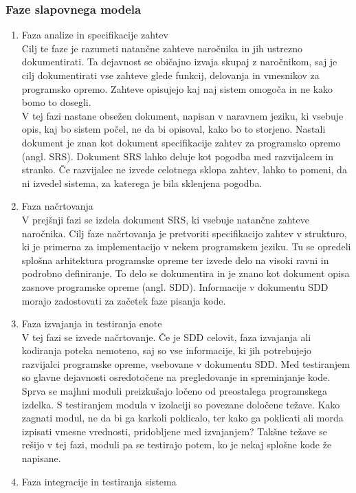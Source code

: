\documentclass[a4paper,12pt,openright]{book}
\begin{document}
\subsubsection{Faze slapovnega modela}
\begin{enumerate}
    \item Faza analize in specifikacije zahtev \\
    Cilj te faze je razumeti natančne zahteve naročnika in jih ustrezno dokumentirati. Ta dejavnost se običajno izvaja skupaj z naročnikom, saj je cilj dokumentirati vse zahteve glede funkcij, delovanja in vmesnikov za programsko opremo. Zahteve opisujejo kaj naj sistem omogoča in ne kako bomo to dosegli. \\
    V tej fazi nastane obsežen dokument, napisan v naravnem jeziku, ki vsebuje opis, kaj bo sistem počel, ne da bi opisoval, kako bo to storjeno. Nastali dokument je znan kot dokument specifikacije zahtev za programsko opremo (angl. SRS). Dokument SRS lahko deluje kot pogodba med razvijalcem in stranko. Če razvijalec ne izvede celotnega sklopa zahtev, lahko to pomeni, da ni izvedel sistema, za katerega je bila sklenjena pogodba.
    \item Faza načrtovanja \\
     V prejšnji fazi se izdela dokument SRS, ki vsebuje natančne zahteve naročnika. Cilj faze načrtovanja je pretvoriti specifikacijo zahtev v strukturo, ki je primerna za implementacijo v nekem programskem jeziku. Tu se opredeli splošna arhitektura programske opreme ter izvede delo na visoki ravni in podrobno deﬁniranje. To delo se dokumentira in je znano kot dokument opisa zasnove programske opreme (angl. SDD). Informacije v dokumentu SDD morajo zadostovati za začetek faze pisanja kode.
    \item Faza izvajanja in testiranja enote \\
    V tej fazi se izvede načrtovanje. Če je SDD celovit, faza izvajanja ali kodiranja poteka nemoteno, saj so vse informacije, ki jih potrebujejo razvijalci programske opreme, vsebovane v dokumentu SDD.
Med testiranjem so glavne dejavnosti osredotočene na pregledovanje in spreminjanje kode. Sprva se majhni moduli preizkušajo ločeno od preostalega programskega izdelka. S testiranjem modula v izolaciji so povezane določene težave. Kako zagnati modul, ne da bi ga karkoli poklicalo, ter kako ga poklicati ali morda izpisati vmesne vrednosti, pridobljene med izvajanjem? Takšne težave se rešijo v tej fazi, moduli pa se testirajo potem, ko je nekaj splošne kode že napisane.
    \item Faza integracije in testiranja sistema \\

\end{enumerate}
\end{document}
